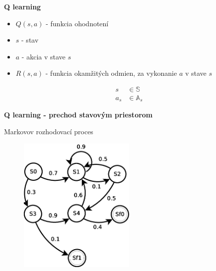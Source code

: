 \documentclass[xcolor=dvipsnames]{beamer}
\begin{document}
\begin{frame}{\bf Q learning}

\begin{itemize}
\item{$Q(s, a)$ - funkcia ohodnotení}
\item{$s$ - stav}
\item{$a$ - akcia v stave $s$}
\item{$R(s, a)$ - funkcia okamžitých odmien, za vykonanie $a$ v stave $s$}
\end{itemize}

\begin{eqnarray}
\label{eq:state_action_set}
	s   &\in \mathbb{S}  \nonumber \\
    a_s &\in \mathbb{A}_s \nonumber
\end{eqnarray}
\end{frame}


\begin{frame}{\bf Q learning - prechod stavovým priestorom}

Markovov rozhodovací proces

\begin{figure}[ht]
\begin{center}
\includegraphics[width=0.5\textwidth]{diagrams/markov_decision.eps}
\end{center}
\end{figure}

\end{frame}
\end{document}
